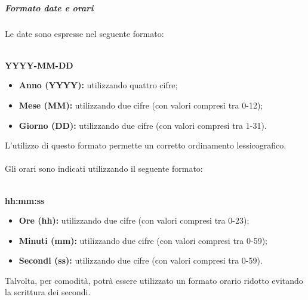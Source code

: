   \subparagraph*{Formato date e orari}
  Le date sono espresse nel seguente formato:\\\\ 
  \centerline{\textbf{YYYY-MM-DD}} 
  \begin{itemize}
  	\item \textbf{Anno (YYYY):} utilizzando quattro cifre;
  	\item \textbf{Mese (MM):} utilizzando due cifre (con valori compresi tra 0-12);
  	\item \textbf{Giorno (DD):} utilizzando due cifre (con valori compresi tra 1-31).
  \end{itemize}
  L'utilizzo di questo formato permette un corretto ordinamento lessicografico.\\\\
  Gli orari sono indicati utilizzando il seguente formato:\\\\
  \centerline{\textbf{hh:mm:ss}} 
  \begin{itemize}
  	\item \textbf{Ore (hh):} utilizzando due cifre (con valori compresi tra 0-23);
  	\item \textbf{Minuti (mm):} utilizzando due cifre (con valori compresi tra 0-59);
  	\item \textbf{Secondi (ss):} utilizzando due cifre (con valori compresi tra 0-59).
  \end{itemize}
  Talvolta, per comodità, potrà essere utilizzato un formato orario ridotto evitando la scrittura dei secondi.
  
